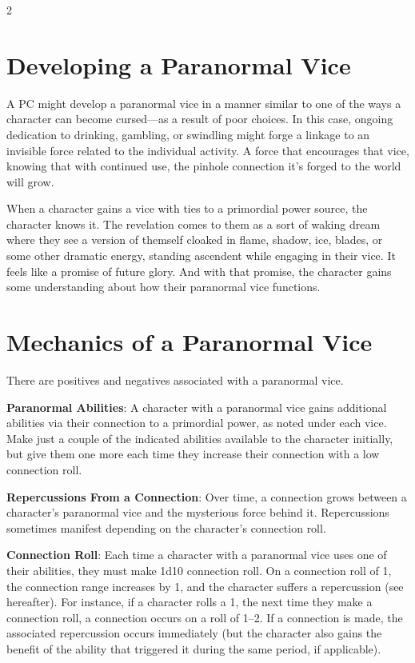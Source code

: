 \begin{multicols}{2}
\section{Developing a Paranormal Vice}

A PC might develop a paranormal vice in a manner similar to one of the ways a character can become cursed—as a result of poor choices. In this case, ongoing dedication to drinking, gambling, or swindling might forge a linkage to an invisible force related to the individual activity. A force that encourages that vice, knowing that with continued use, the pinhole connection it’s forged to the world will grow. 

When a character gains a vice with ties to a primordial power source, the character knows it. The revelation comes to them as a sort of waking dream where they see a version of themself cloaked in flame, shadow, ice, blades, or some other dramatic energy, standing ascendent while engaging in their vice. It feels like a promise of future glory. And with that promise, the character gains some understanding about how their paranormal vice functions.

\section{Mechanics of a Paranormal Vice}
 
There are positives and negatives associated with a paranormal vice. 

\textbf{Paranormal Abilities}: A character with a paranormal vice gains additional abilities via their connection to a primordial power, as noted under each vice. Make just a couple of the indicated abilities available to the character initially, but give them one more each time they increase their connection with a low connection roll. 

\textbf{Repercussions From a Connection}: Over time, a connection grows between a character’s paranormal vice and the mysterious force behind it. Repercussions sometimes manifest depending on the character’s connection roll. 

\textbf{Connection Roll}: Each time a character with a paranormal vice uses one of their abilities, they must make 1d10 connection roll. On a connection roll of 1, the connection range increases by 1, and the character suffers a repercussion (see hereafter). For instance, if a character rolls a 1, the next time they make a connection roll, a connection occurs on a roll of 1–2. If a connection is made, the associated repercussion occurs immediately (but the character also gains the benefit of the ability that triggered it during the same period, if applicable). 


\end{multicols}
